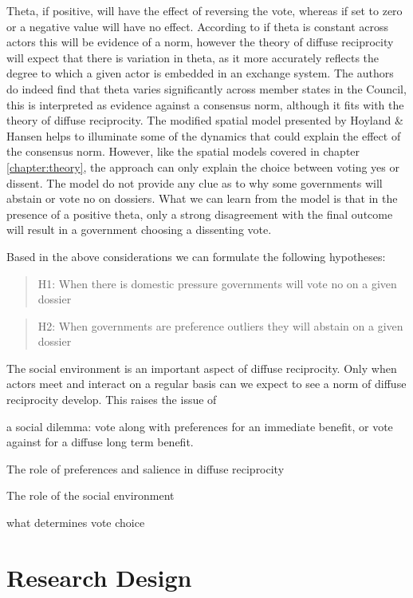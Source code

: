 Theta, if positive, will have the effect of reversing the vote, whereas if set to zero or a negative value will have no effect. According to \citet{HoylandHansen2010} if theta is constant across actors this will be evidence of a norm, however the theory of diffuse reciprocity will expect that there is variation in theta, as it more accurately reflects the degree to which a given actor is embedded in an exchange system. The authors do indeed find that theta varies significantly across member states in the Council, this is interpreted as evidence against a consensus norm, although it fits with the theory of diffuse reciprocity. The modified spatial model presented by Hoyland \& Hansen helps to illuminate some of the dynamics that could explain the effect of the consensus norm. However, like the spatial models covered in chapter \ref{chapter:theory}, the approach can only explain the choice between voting yes or dissent. The model do not provide any clue as to why some governments will abstain or vote no on dossiers. What we can learn from the model is that in the presence of a positive theta, only a strong disagreement with the final outcome will result in a government choosing a dissenting vote. 

Based in the above considerations we can formulate the following hypotheses:

\begin{quote}
  H1: When there is domestic pressure governments will vote no on a given dossier
\end{quote}

\begin{quote}
  H2: When governments are preference outliers they will abstain on a given dossier
\end{quote}

The social environment is an important aspect of diffuse reciprocity. Only when actors meet and interact on a regular basis can we expect to see a norm of diffuse reciprocity develop. This raises the issue of 

a social dilemma: vote along with preferences for an immediate benefit, or vote against for a diffuse long term benefit. 


The role of preferences and salience in diffuse reciprocity

The role of the social environment

what determines vote choice


\section{Research Design}

